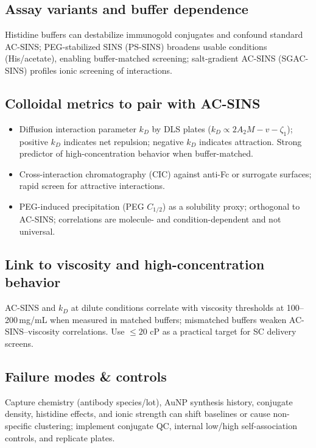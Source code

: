 \subsection*{Assay variants and buffer dependence}
Histidine buffers can destabilize immunogold conjugates and confound standard AC-SINS; PEG-stabilized SINS (PS-SINS) broadens usable conditions (His/acetate), enabling buffer-matched screening; salt-gradient AC-SINS (SGAC-SINS) profiles ionic screening of interactions. \cite{Phan2022,Bailly2020,Jain2023}

\subsection*{Colloidal metrics to pair with AC-SINS}
\begin{itemize}\setlength\itemsep{2pt}
\item Diffusion interaction parameter \(k_D\) by DLS plates (\(k_D \propto 2A_2M - v - \zeta_1\)); positive \(k_D\) indicates net repulsion; negative \(k_D\) indicates attraction. Strong predictor of high-concentration behavior when buffer-matched. \cite{Wyatt_kD,Phan2022,Zarzar2023}
\item Cross-interaction chromatography (CIC) against anti-Fc or surrogate surfaces; rapid screen for attractive interactions. \cite{Hedberg2018,Kelly2015}
\item PEG-induced precipitation (PEG \(C_{1/2}\)) as a solubility proxy; orthogonal to AC-SINS; correlations are molecule- and condition-dependent and not universal. \cite{Oeller2021,Sormanni2017,Walchli2020}
\end{itemize}

\subsection*{Link to viscosity and high-concentration behavior}
AC-SINS and \(k_D\) at dilute conditions correlate with viscosity thresholds at 100–200\,mg/mL when measured in matched buffers; mismatched buffers weaken AC-SINS–viscosity correlations. Use \(\le 20\) cP as a practical target for SC delivery screens. \cite{Avery2018,Phan2022,Bhandari2023,Lefevre2025}

\subsection*{Failure modes \& controls}
Capture chemistry (antibody species/lot), AuNP synthesis history, conjugate density, histidine effects, and ionic strength can shift baselines or cause non-specific clustering; implement conjugate QC, internal low/high self-association controls, and replicate plates. \cite{Geng2016_Bioconj,Phan2022,Estep2015}

